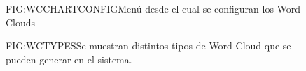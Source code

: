 \begin{figure}[Configuración de un Word Cloud]{FIG:WCCHARTCONFIG}{Menú desde el cual se configuran los Word Clouds}
\end{figure}

\begin{figure}[Diferentes tipos de World Cloud]{FIG:WCTYPES}{Se muestran distintos tipos de Word Cloud que se pueden generar en el sistema.}
	 \quad
	\quad
\end{figure}